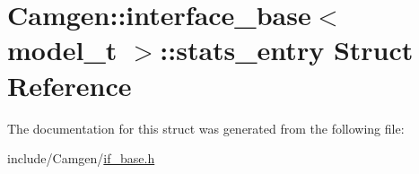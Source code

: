 \hypertarget{a00510}{\section{Camgen\-:\-:interface\-\_\-base$<$ model\-\_\-t $>$\-:\-:stats\-\_\-entry Struct Reference}
\label{a00510}
}


The documentation for this struct was generated from the following file\-:\begin{DoxyCompactItemize}
\item 
include/\-Camgen/\hyperlink{a00646}{if\-\_\-base.\-h}\end{DoxyCompactItemize}
